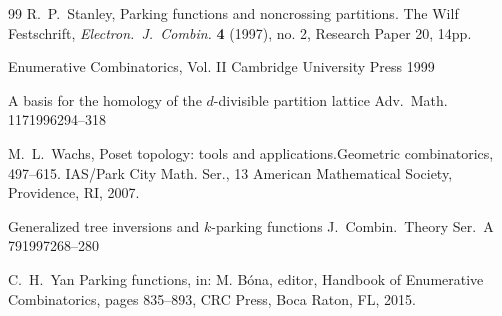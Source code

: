 \documentclass[11pt]{amsart}
\numberwithin{equation}{section}
\begin{document}
\begin{thebibliography}{99}
{\sc R.\ P.\ Stanley},
Parking functions and noncrossing partitions.
The Wilf Festschrift,
{\em Electron.\ J.\ Combin.}
{\bf 4} (1997), no. 2, Research Paper 20, 14pp.

     {Enumerative Combinatorics, Vol. II}
     {Cambridge University Press}
     {1999}

        {A basis for the homology of the $d$-divisible partition lattice}
        {Adv.\ Math.}
        {117}{1996}{294--318}

{\sc M.\ L.\ Wachs,}
Poset topology: tools and applications.Geometric combinatorics, 497–615.
IAS/Park City Math. Ser., 13
American Mathematical Society, Providence, RI, 2007.

            {Generalized tree inversions and $k$-parking functions}
            {J.\ Combin.\ Theory Ser.\ A}
            {79}{1997}{268--280}

  {\sc C.\ H.\ Yan}
  Parking functions, in: M. B\'ona, editor,  Handbook of Enumerative
  Combinatorics, pages 835--893, CRC Press, Boca Raton, FL, 2015. 

\end{thebibliography}
\end{document}
